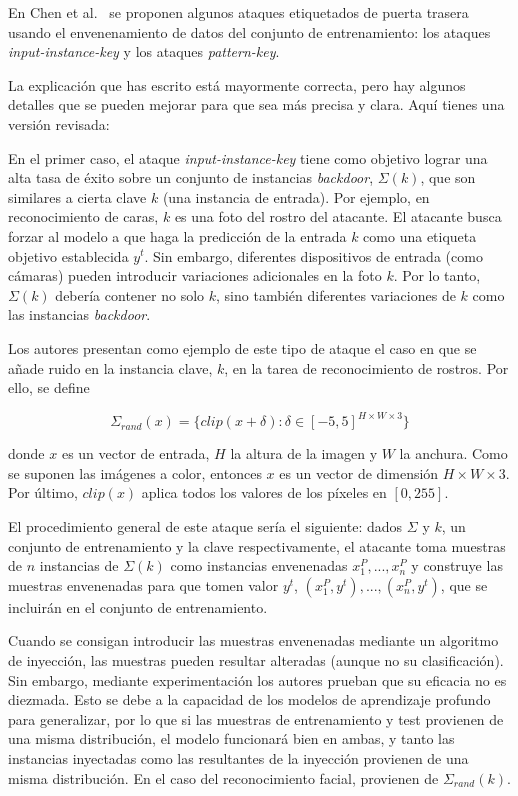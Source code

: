 En Chen et al.~\cite{Backdoor} se proponen algunos ataques etiquetados de puerta trasera usando el envenenamiento de datos del conjunto de entrenamiento: los ataques \textit{input-instance-key} y los ataques \textit{pattern-key}.

La explicación que has escrito está mayormente correcta, pero hay algunos detalles que se pueden mejorar para que sea más precisa y clara. Aquí tienes una versión revisada:

En el primer caso, el ataque \textit{input-instance-key} tiene como objetivo lograr una alta tasa de éxito sobre un conjunto de instancias \textit{backdoor}, $\Sigma(k)$, que son similares a cierta clave $k$ (una instancia de entrada). Por ejemplo, en reconocimiento de caras, $k$ es una foto del rostro del atacante. El atacante busca forzar al modelo a que haga la predicción de la entrada $k$ como una etiqueta objetivo establecida $y^t$. Sin embargo, diferentes dispositivos de entrada (como cámaras) pueden introducir variaciones adicionales en la foto $k$. Por lo tanto, $\Sigma(k)$ debería contener no solo $k$, sino también diferentes variaciones de $k$ como las instancias \textit{backdoor}.

Los autores presentan como ejemplo de este tipo de ataque el caso en que se añade ruido en la instancia clave, $k$, en la tarea de reconocimiento de rostros. Por ello, se define

$$\Sigma_{rand}(x)= \{clip(x+\delta): \delta \in [-5,5]^{H \times W \times 3}\}$$

donde $x$ es un vector de entrada, $H$ la altura de la imagen y $W$ la anchura. Como se suponen las imágenes a color, entonces $x$ es un vector de dimensión $H \times W \times 3$. Por último, $clip(x)$ aplica todos los valores de los píxeles en $[0,255]$.

El procedimiento general de este ataque sería el siguiente: dados $\Sigma$ y $k$, un conjunto de entrenamiento y la clave respectivamente, el atacante toma muestras de $n$ instancias de $\Sigma(k)$ como instancias envenenadas $x_1^P,...,x_n^P$ y construye las muestras envenenadas para que tomen valor $y^t$, $(x_1^P,y^t),...,(x_n^P,y^t)$, que se incluirán en el conjunto de entrenamiento.

Cuando se consigan introducir las muestras envenenadas mediante un algoritmo de inyección, las muestras pueden resultar alteradas (aunque no su clasificación). Sin embargo, mediante experimentación los autores prueban que su eficacia no es diezmada. Esto se debe a la capacidad de los modelos de aprendizaje profundo para generalizar, por lo que si las muestras de entrenamiento y test provienen de una misma distribución, el modelo funcionará bien en ambas, y tanto las instancias inyectadas como las resultantes de la inyección provienen de una misma distribución. En el caso del reconocimiento facial, provienen de $\Sigma_{rand}(k)$.

